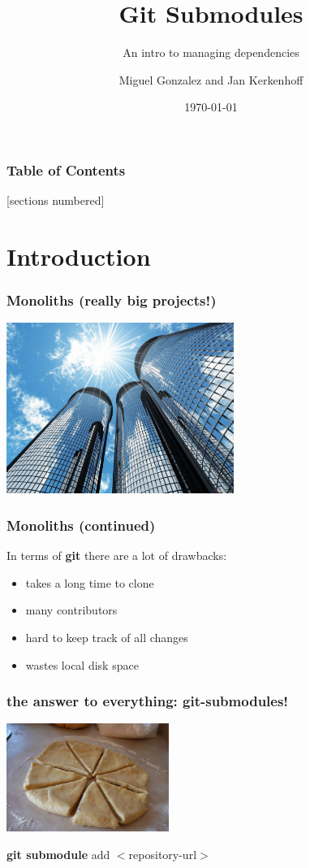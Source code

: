 \documentclass[10pt]{beamer}
\title{Git Submodules}
\subtitle{An intro to managing dependencies}
\date{\today}
\author{Miguel Gonzalez and Jan Kerkenhoff}
\institute{Fontys Hogeschool Venlo}
\begin{document}
\maketitle

\begin{frame}
  \frametitle{Table of Contents}
  [sections numbered]
  \tableofcontents[hideallsubsections]
\end{frame}


\section{Introduction}
\begin{frame}
  \frametitle{Monoliths (really big projects!)}
  \begin{center}\includegraphics[width=280px]{images/monoliths.jpg}\end{center}
\end{frame}

\begin{frame}
  \frametitle{Monoliths (continued)}
  In terms of \textbf{git} there are a lot of drawbacks:
  \begin{itemize}
  	\item takes a long time to clone
  	\item many contributors
  	\item hard to keep track of all changes
  	\item wastes local disk space
  \end{itemize}  
\end{frame}

\begin{frame}
  \frametitle{the answer to everything: git-submodules!}
  \begin{center}\includegraphics[width=200px]{images/divide.jpg}\end{center}
  \begin{center}\textbf{git submodule }add $<$repository-url$>$\end{center}
\end{frame}
\end{document}
